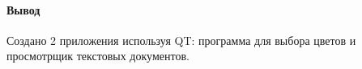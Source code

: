 \paragraph{Вывод}
Создано 2 приложения используя QT: программа для выбора цветов и просмотрщик текстовых документов.